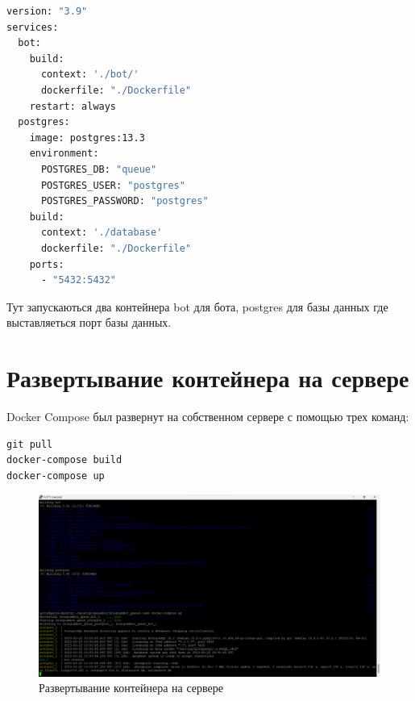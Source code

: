 \begin{lstlisting}[language=Dockerfile
	, caption=\leftline{Dockerfile базы данных}
	, label=lst:DС
	, columns=flexible
	]
version: "3.9"
services:
  bot:
    build:
      context: './bot/'
      dockerfile: "./Dockerfile"
    restart: always
  postgres:
    image: postgres:13.3
    environment:
      POSTGRES_DB: "queue"
      POSTGRES_USER: "postgres"
      POSTGRES_PASSWORD: "postgres"
    build:
      context: './database'
      dockerfile: "./Dockerfile"
    ports:
      - "5432:5432"
\end{lstlisting}

Тут запускаються два контейнера bot для бота, postgres для базы данных
где выставляеться порт базы данных.

\section{Развертывание контейнера на сервере}
Docker Compose был развернут на собственном сервере с помощью трех команд:

\begin{verbatim}
git pull
docker-compose build
docker-compose up
\end{verbatim}

\begin{figure}[h!tp]
  \centering
  \includegraphics[width=1\textwidth]{server_run}
  \caption{Развертывание контейнера на сервере}
  \label{fig:server:run}
\end{figure}

